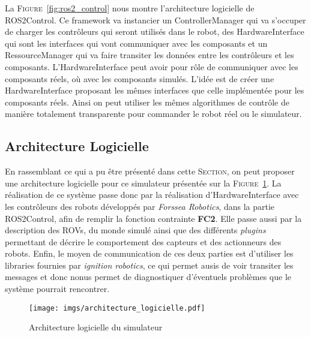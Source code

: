             La \textsc{Figure}~\ref{fig:ros2_control} nous montre l'architecture logicielle de \gls{ROS2Control}. Ce framework va instancier un \gls{ControllerManager} qui va s'occuper de charger les contrôleurs qui seront utilisés dans le robot, des \gls{HardwareInterface} qui sont les interfaces qui vont communiquer avec les composants et un \gls{RessourceManager} qui va faire transiter les données entre les contrôleurs et les composants. L'\gls{HardwareInterface} peut avoir pour rôle de communiquer avec les composants réels, où avec les composants simulés. L'idée est de créer une \gls{HardwareInterface} proposant les mêmes interfaces que celle implémentée pour les composants réels. Ainsi on peut utiliser les mêmes algorithmes de contrôle de manière totalement transparente pour commander le robot réel ou le simulateur.

        \subsection{Architecture Logicielle}

            En rassemblant ce qui a pu être présenté dans cette \textsc{Section}, on peut proposer une architecture logicielle pour ce simulateur présentée sur la \textsc{Figure}~\ref{fig:architecture_logicielle}. La réalisation de ce système passe donc par la réalisation d'\gls{HardwareInterface} avec les contrôleurs des robots développés par \textit{Forssea Robotics}, dans la partie \gls{ROS2Control}, afin de remplir la fonction contrainte \textbf{FC2}. Elle passe aussi par la description des \gls{ROV}s, du monde simulé ainsi que des différents \textit{plugins} permettant de décrire le comportement des capteurs et des actionneurs des robots. Enfin, le moyen de communication de ces deux parties est d'utiliser les libraries fournies par \textit{ignition robotics}, ce qui permet ausis de voir transiter les messages et donc nonus permet de diagnostiquer d'éventuels problèmes que le système pourrait rencontrer.
            
            \begin{figure}[!htb]
                \centering
                \texttt{[image: imgs/architecture\_logicielle.pdf]}
                \caption{Architecture logicielle du simulateur}
                \label{fig:architecture_logicielle}
            \end{figure}